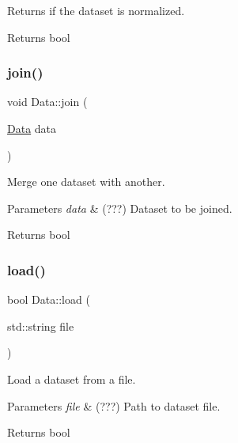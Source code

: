 Returns if the dataset is normalized. 

\begin{DoxyReturn}{Returns}
bool 
\end{DoxyReturn}
\mbox{\label{class_data_a83c2a01ded98c4fad0b5b31538039046}} 
\subsubsection{\texorpdfstring{join()}{join()}}
{\footnotesize\ttfamily void Data\+::join (\begin{DoxyParamCaption}\item[{\hyperlink{class_data}{Data}}]{data }\end{DoxyParamCaption})}



Merge one dataset with another. 


\begin{DoxyParams}{Parameters}
{\em data} & (???) Dataset to be joined. \\
\hline
\end{DoxyParams}
\begin{DoxyReturn}{Returns}
bool 
\end{DoxyReturn}
\mbox{\label{class_data_ac2ed251251be234c607f486e16902112}} 
\subsubsection{\texorpdfstring{load()}{load()}}
{\footnotesize\ttfamily bool Data\+::load (\begin{DoxyParamCaption}\item[{std\+::string}]{file }\end{DoxyParamCaption})}



Load a dataset from a file. 


\begin{DoxyParams}{Parameters}
{\em file} & (???) Path to dataset file. \\
\hline
\end{DoxyParams}
\begin{DoxyReturn}{Returns}
bool 
\end{DoxyReturn}
\mbox{\label{class_data_a38bbab57bd9d871bd78771df47529d6b}} 
